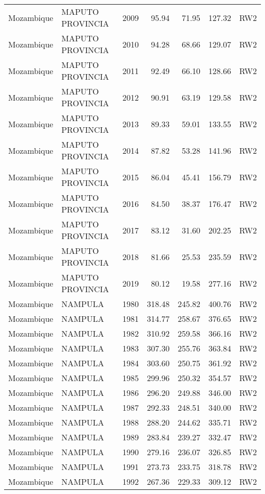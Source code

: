 \begin{longtable}{lllrrrl}
  Mozambique & MAPUTO PROVINCIA & 2009 & 95.94 & 71.95 & 127.32 & RW2 \\ 
  Mozambique & MAPUTO PROVINCIA & 2010 & 94.28 & 68.66 & 129.07 & RW2 \\ 
  Mozambique & MAPUTO PROVINCIA & 2011 & 92.49 & 66.10 & 128.66 & RW2 \\ 
  Mozambique & MAPUTO PROVINCIA & 2012 & 90.91 & 63.19 & 129.58 & RW2 \\ 
  Mozambique & MAPUTO PROVINCIA & 2013 & 89.33 & 59.01 & 133.55 & RW2 \\ 
  Mozambique & MAPUTO PROVINCIA & 2014 & 87.82 & 53.28 & 141.96 & RW2 \\ 
  Mozambique & MAPUTO PROVINCIA & 2015 & 86.04 & 45.41 & 156.79 & RW2 \\ 
  Mozambique & MAPUTO PROVINCIA & 2016 & 84.50 & 38.37 & 176.47 & RW2 \\ 
  Mozambique & MAPUTO PROVINCIA & 2017 & 83.12 & 31.60 & 202.25 & RW2 \\ 
  Mozambique & MAPUTO PROVINCIA & 2018 & 81.66 & 25.53 & 235.59 & RW2 \\ 
  Mozambique & MAPUTO PROVINCIA & 2019 & 80.12 & 19.58 & 277.16 & RW2 \\ 
  Mozambique & NAMPULA & 1980 & 318.48 & 245.82 & 400.76 & RW2 \\ 
  Mozambique & NAMPULA & 1981 & 314.77 & 258.67 & 376.65 & RW2 \\ 
  Mozambique & NAMPULA & 1982 & 310.92 & 259.58 & 366.16 & RW2 \\ 
  Mozambique & NAMPULA & 1983 & 307.30 & 255.76 & 363.84 & RW2 \\ 
  Mozambique & NAMPULA & 1984 & 303.60 & 250.75 & 361.92 & RW2 \\ 
  Mozambique & NAMPULA & 1985 & 299.96 & 250.32 & 354.57 & RW2 \\ 
  Mozambique & NAMPULA & 1986 & 296.20 & 249.88 & 346.00 & RW2 \\ 
  Mozambique & NAMPULA & 1987 & 292.33 & 248.51 & 340.00 & RW2 \\ 
  Mozambique & NAMPULA & 1988 & 288.20 & 244.62 & 335.71 & RW2 \\ 
  Mozambique & NAMPULA & 1989 & 283.84 & 239.27 & 332.47 & RW2 \\ 
  Mozambique & NAMPULA & 1990 & 279.16 & 236.07 & 326.85 & RW2 \\ 
  Mozambique & NAMPULA & 1991 & 273.73 & 233.75 & 318.78 & RW2 \\ 
  Mozambique & NAMPULA & 1992 & 267.36 & 229.33 & 309.12 & RW2 \\ 

\end{longtable}
